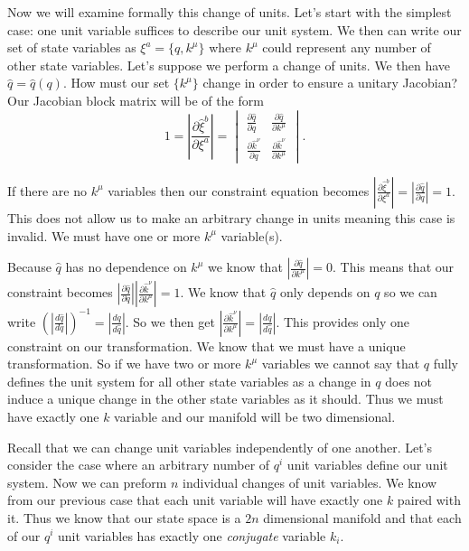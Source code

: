\documentclass{article}
\begin{document}
	Now we will examine formally this change of units. Let's start with the simplest case: one unit variable suffices to describe our unit system. We then can write our set of state variables as $\xi^a = \{q,k^\mu\}$ where $k^\mu$ could represent any number of other state variables. Let's suppose we perform a change of units. We then have $\hat{q} = \hat{q}(q)$. How must our set $\{k^\mu\}$ change in order to ensure a unitary Jacobian? Our Jacobian block matrix will be of the form $$1 = \left|\frac{\partial\hat{\xi}^b}{\partial\xi^a}\right| = \begin{vmatrix}
\frac{\partial \hat{q}}{\partial q} & \frac{\partial \hat{q}}{\partial k^\mu} \\
\frac{\partial \hat{k}^\nu}{\partial q} & \frac{\partial \hat{k}^\nu}{\partial k^\mu}
\end{vmatrix}.$$

	If there are no $k^\mu$ variables then our constraint equation becomes $\left|\frac{\partial\hat{\xi}^b}{\partial\xi^a}\right| = \left|\frac{\partial \hat{q}}{\partial q}\right| = 1$. This does not allow us to make an arbitrary change in units meaning this case is invalid. We must have one or more $k^\mu$ variable(s).

	Because $\hat{q}$ has no dependence on $k^\mu$ we know that $\left|\frac{\partial \hat{q}}{\partial k^\mu}\right| = 0$. This means that our constraint becomes $\left|\frac{\partial \hat{q}}{\partial q}\right|\left|\frac{\partial \hat{k}^\nu}{\partial k^\mu}\right| = 1$. We know that $\hat{q}$ only depends on $q$ so we can write $(\left|\frac{d \hat{q}}{d q}\right|)^{-1} = \left|\frac{d q}{d \hat{q}}\right|$. So we then get $\left|\frac{\partial \hat{k}^\nu}{\partial k^\mu}\right| = \left|\frac{d q}{d \hat{q}}\right|$. This provides only one constraint on our transformation. We know that we must have a unique transformation. So if we have two or more $k^\mu$ variables we cannot say that $q$ fully defines the unit system for all other state variables as a change in $q$ does not induce a unique change in the other state variables as it should. Thus we must have exactly one $k$ variable and our manifold will be two dimensional.

	Recall that we can change unit variables independently of one another. Let's consider the case where an arbitrary number of $q^i$ unit variables define our unit system. Now we can preform $n$ individual changes of unit variables. We know from our previous case that each unit variable will have exactly one $k$ paired with it. Thus we know that our state space is a $2n$ dimensional manifold and that each of our $q^i$ unit variables has exactly one \textit{conjugate} variable $k_i$.
\end{document}

